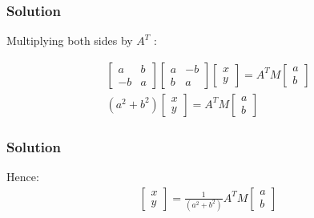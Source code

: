 \documentclass{beamer}
\begin{document}
\begin{frame}
\frametitle{Solution}
Multiplying both sides by $A^{T}$ :

\begin{align}
    \begin{bmatrix}a & b\\ -b & a\end{bmatrix}\begin{bmatrix}a & -b\\b & a\end{bmatrix}\begin{bmatrix}x \\ y\end{bmatrix} = A^{T}M\begin{bmatrix}a \\ b\end{bmatrix}\\
    (a^{2} + b^{2})\begin{bmatrix}x \\y\end{bmatrix} = A^{T}M\begin{bmatrix}a \\ b\end{bmatrix}
\end{align}
\end{frame}

 \begin{frame}
 \frametitle{Solution}
 Hence:
\begin{align}
    \begin{bmatrix}x \\ y\end{bmatrix} = \frac{1}{(a^{2} + b^{2})} A^{T}M\begin{bmatrix}a \\ b\end{bmatrix}
\end{align}
\end{frame}

 
\end{document}
